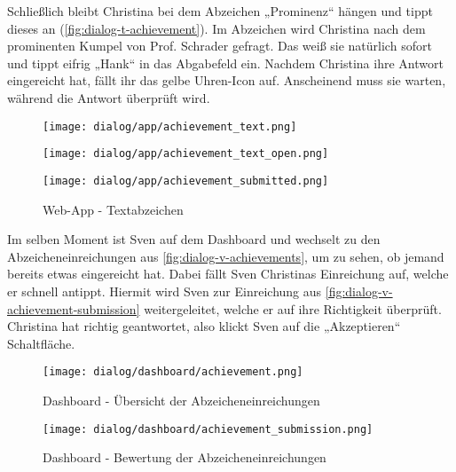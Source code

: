 Schließlich bleibt Christina bei dem Abzeichen „Prominenz“ hängen und tippt
dieses an (\autoref{fig:dialog-t-achievement}). Im Abzeichen wird Christina
nach dem prominenten Kumpel von Prof. Schrader gefragt. Das weiß sie natürlich
sofort und tippt eifrig „Hank“ in das Abgabefeld ein. Nachdem Christina ihre
Antwort eingereicht hat, fällt ihr das gelbe Uhren-Icon auf. Anscheinend muss
sie warten, während die Antwort überprüft wird.

\begin{figure}[htpb]
    \centering
    \begin{minipage}{.325\textwidth}
        \centering
        \texttt{[image: dialog/app/achievement\_text.png]}
    \end{minipage}%
    \begin{minipage}{.325\textwidth}
        \centering
        \texttt{[image: dialog/app/achievement\_text\_open.png]}
    \end{minipage}
    \begin{minipage}{.325\textwidth}
        \centering
        \texttt{[image: dialog/app/achievement\_submitted.png]}
    \end{minipage}
    \caption{Web-App - Textabzeichen}
    \label{fig:dialog-t-achievement}
\end{figure}

Im selben Moment ist Sven auf dem Dashboard und wechselt zu den
Abzeicheneinreichungen aus \autoref{fig:dialog-v-achievements}, um zu sehen, ob
jemand bereits etwas eingereicht hat. Dabei fällt Sven Christinas Einreichung
auf, welche er schnell antippt. Hiermit wird Sven zur Einreichung aus
\autoref{fig:dialog-v-achievement-submission} weitergeleitet, welche er auf ihre
Richtigkeit überprüft. Christina hat richtig geantwortet, also klickt Sven auf
die „Akzeptieren“ Schaltfläche.

\begin{figure}[htpb]
    \centering
    \texttt{[image: dialog/dashboard/achievement.png]}
    \caption{Dashboard - Übersicht der Abzeicheneinreichungen}
    \label{fig:dialog-v-achievements}
\end{figure}

\begin{figure}[htpb]
    \centering
    \texttt{[image: dialog/dashboard/achievement\_submission.png]}
    \caption{Dashboard - Bewertung der Abzeicheneinreichungen}
    \label{fig:dialog-v-achievement-submission}
\end{figure}


